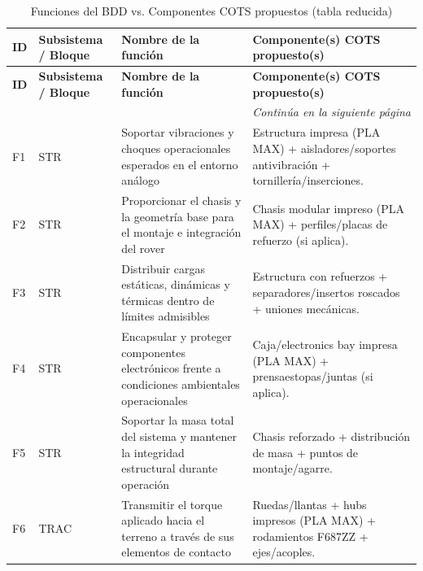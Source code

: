 \begin{landscape}
\scriptsize
\renewcommand{\arraystretch}{1.15}
\setlength{\tabcolsep}{3pt}
\begin{longtable}{|p{0.9cm}|p{2.0cm}|p{6.8cm}|p{9.2cm}|}
\caption{Funciones del BDD vs. Componentes COTS propuestos (tabla reducida)}\label{tab:funciones_cots_reducida}\\
\hline
\textbf{ID} & \textbf{Subsistema / Bloque} & \textbf{Nombre de la función} & \textbf{Componente(s) COTS propuesto(s)}\\
\hline
\endfirsthead

\hline
\textbf{ID} & \textbf{Subsistema / Bloque} & \textbf{Nombre de la función} & \textbf{Componente(s) COTS propuesto(s)}\\
\hline
\endhead

\hline
\multicolumn{4}{r}{\textit{Continúa en la siguiente página}}\\
\endfoot

\hline
\endlastfoot

F1 & STR & Soportar vibraciones y choques operacionales esperados en el entorno análogo &
Estructura impresa (PLA MAX) + aisladores/soportes antivibración + tornillería/inserciones.\\ \hline

F2 & STR & Proporcionar el chasis y la geometría base para el montaje e integración del rover &
Chasis modular impreso (PLA MAX) + perfiles/placas de refuerzo (si aplica).\\ \hline

F3 & STR & Distribuir cargas estáticas, dinámicas y térmicas dentro de límites admisibles &
Estructura con refuerzos + separadores/insertos roscados + uniones mecánicas.\\ \hline

F4 & STR & Encapsular y proteger componentes electrónicos frente a condiciones ambientales operacionales &
Caja/electronics bay impresa (PLA MAX) + prensaestopas/juntas (si aplica).\\ \hline

F5 & STR & Soportar la masa total del sistema y mantener la integridad estructural durante operación &
Chasis reforzado + distribución de masa + puntos de montaje/agarre.\\ \hline

F6 & TRAC & Transmitir el torque aplicado hacia el terreno a través de sus elementos de contacto &
Ruedas/llantas + hubs impresos (PLA MAX) + rodamientos F687ZZ + ejes/acoples.\\ \hline


\end{longtable}
\end{landscape}
